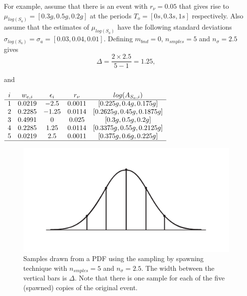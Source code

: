 For example, assume that there is an event with $r_\nu=0.05$ that
gives rise to \mbox{$\mu_{log(S_a)}=[0.3g, 0.5g, 0.2g]$} at the
periods \mbox{$T_o = [0s,0.3s,1s]$} respectively. Also assume that
the estimates of $\mu_{log(S_a)}$ have the following standard
deviations \mbox{$\sigma_{log(S_a)}=\sigma_a = [0.03,0.04,0.01]$}.
Defining $m_{bnd}=0$, $n_{smples}=5$ and $n_\sigma=2.5$ gives
\begin{equation}
\Delta = \frac{2 \times 2.5}{5-1} = 1.25,
\end{equation}

and

\begin{center} $ \begin{array}{ccccc}
i & w_{e,i} & \epsilon_i & r_\nu & log(A_{S_a,i}) \\
\hline
1 & 0.0219 & -2.5 & 0.0011 & [0.225g, 0.4g, 0.175g] \\
2 & 0.2285 & -1.25 & 0.0114 & [0.2625g, 0.45g, 0.1875g] \\
3 & 0.4991 & 0 & 0.025 & [0.3g, 0.5g, 0.2g] \\
4 & 0.2285 & 1.25 & 0.0114 & [0.3375g, 0.55g, 0.2125g] \\
5 & 0.0219 & 2.5 & 0.0011 & [0.375g, 0.6g, 0.225g] \\
\hline
\end{array}$
\end{center}

\begin{figure}
\includegraphics[width=1\textwidth]{diags/fig-hattn-spawning}
\caption{Samples drawn from a PDF using the sampling by spawning
technique with $n_{smples}=5$ and $n_\sigma=2.5$. The width
between the vertical bars is $\Delta$. Note that there is one
sample for each of the five (spawned) copies of the original
event.} \label{fig:hattn-spawnsamp}
\end{figure}


